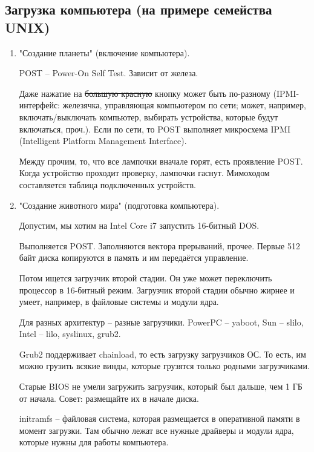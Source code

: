 \documentclass[a4paper,10pt]{article}
\begin{document}
\subsection{Загрузка компьютера (на примере семейства UNIX)}
\begin{enumerate}
\item "Создание планеты" (включение компьютера).

POST -- Power-On Self Test. Зависит от железа.

Даже нажатие на \sout{большую красную} кнопку может быть по-разному (IPMI-интерфейс: железячка, управляющая компьютером по сети; может, например, включать/выключать компьютер, выбирать устройства, которые будут включаться, проч.).
Если по сети, то POST выполняет микросхема IPMI (Intelligent Platform Management Interface).

Между прочим, то, что все лампочки вначале горят, есть проявление POST. Когда устройство проходит проверку, лампочки гаснут. Мимоходом составляется таблица подключенных устройств.

\item "Создание животного мира" (подготовка компьютера).

Допустим, мы хотим на Intel Core i7 запустить 16-битный DOS.

Выполняется POST. Заполняются вектора прерываний, прочее. Первые 512 байт диска копируются в память и им передаётся управление. 

Потом ищется загрузчик второй стадии. Он уже может переключить процессор в 16-битный режим. Загрузчик второй стадии обычно жирнее и умеет, например, в файловые системы и модули ядра.

Для разных архитектур -- разные загрузчики.
PowerPC -- yaboot, Sun -- slilo, Intel -- lilo, syslinux, grub2.

Grub2 поддерживает chainload, то есть загрузку загрузчиков ОС. То есть, им можно грузить всякие винды, которые грузятся только родными загрузчиками.

Старые BIOS не умели загружить загрузчик, который был дальше, чем 1 ГБ от начала. Совет: размещайте их в начале диска.

initramfs -- файловая система, которая размещается в оперативной памяти в момент загрузки. Там обычно лежат все нужные драйверы и модули ядра, которые нужны для работы компьютера.


\end{enumerate}
\end{document}
